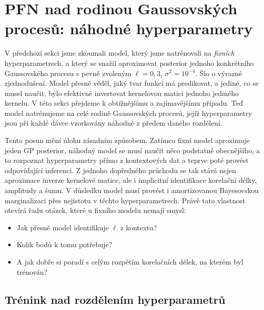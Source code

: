 \section{PFN nad rodinou Gaussovských procesů: náhodné hyperparametry}
\label{sec:pfn-random-hp}

V předchozí sekci jsme zkoumali model, který jsme natrénovali na \textit{fixních} hyperparametrech, a který se snažil aproximovat posterior jednoho konkrétního Gaussovského procesu s pevně zvoleným $\ell = 0{,}3$, $\sigma^2 = 10^{-4}$.
Šlo o výrazné zjednodušení.
Model přesně věděl, jaký tvar funkcí má predikovat, a jediné, co se musel naučit, bylo efektivně invertovat kernelovou matici jednoho jediného kernelu.
V této sekci přejdeme k obtížnějšímu a zajímavějšímu případu.
Teď model natrénujeme na celé rodině Gaussovských procesů, jejíž hyperparametry jsou při každé dávce vzorkovány náhodně z předem daného rozdělení.
\par

Tento posun mění úlohu zásadním způsobem.
Zatímco fixní model aproximuje jeden GP posterior, náhodný model se musí naučit něco podstatně obecnějšího, a to rozpoznat hyperparametry přímo z kontextových dat a teprve poté provést odpovídající inferenci.
Z jednoho dopředného průchodu se tak stává nejen aproximace inverze kernelové matice, ale i implicitní identifikace korelační délky, amplitudy a šumu.
V důsledku model musí provést i amortizovanou Bayesovskou marginalizaci přes nejistotu v těchto hyperparametrech.
Právě tato vlastnost otevírá řadu otázek, které u fixního modelu nemají smysl: 
\begin{itemize}
    \item Jak přesně model identifikuje $\ell$ z kontextu?
    \item Kolik bodů k tomu potřebuje?
    \item A jak dobře si poradí s celým rozpětím korelačních délek, na kterém byl trénován?
\end{itemize}

\subsection{Trénink nad rozdělením hyperparametrů}
\label{subsec:trenink-distribuce-hp}

